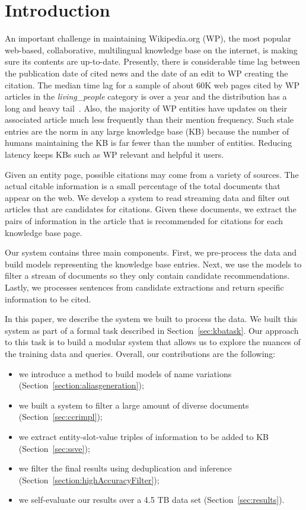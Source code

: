 
\section{Introduction}


An important challenge in maintaining Wikipedia.org (WP), the most popular 
web-based, collaborative, multilingual knowledge base on the internet, is  
making sure its contents are up-to-date. Presently, there is considerable time lag 
between the publication date of cited news and the date of an edit to WP 
creating the citation. The median time lag for a sample of about 60K
web pages cited by WP articles in the \textit{living\_people} category is over 
a year and the distribution has a long and heavy tail~\cite{JFrank12}. 
Also, the majority of WP entities have updates on their associated article much 
less frequently than their mention frequency. Such stale entries 
are the norm in any large knowledge base (KB) because the number of humans 
maintaining the KB is far fewer than the number of entities. 
Reducing latency keeps KBs such as WP relevant and helpful it users.

Given an entity page, possible citations may come from a variety of sources.
The actual citable information is a small percentage of the total documents that appear on the web.
We develop a system to read streaming data and filter out articles that are candidates for citations.
Given these documents, we extract the pairs of information in the 
article that is recommended for citations for each knowledge base page.

Our system contains three main components. First, we pre-process the data and
build models representing the knowledge base entries.
Next, we use the models to filter a stream of documents so they only contain 
candidate recommendations.
Lastly, we processes sentences from candidate extractions and return 
specific information to be cited.


In this paper, we describe the system we built to process the data.
We built this system as part of a formal task described in Section~\ref{sec:kbatask}.
Our approach to this task is to build a modular system
that allows us to explore the nuances of the training data and queries.
Overall, our contributions are the following:
\begin{itemize}[noitemsep,nolistsep]
\item we introduce a method to build models of name variations (Section~\ref{section:aliasgeneration});
\item we built a system to filter a large amount of diverse documents (Section~\ref{sec:ccrimpl});
\item we extract entity-slot-value triples of information to be added to KB (Section~\ref{sec:ssve});
\item we filter the final results using deduplication and inference (Section~\ref{section:highAccuracyFilter});
\item we self-evaluate our results over a 4.5 TB data set (Section~\ref{sec:results}).
\end{itemize}






